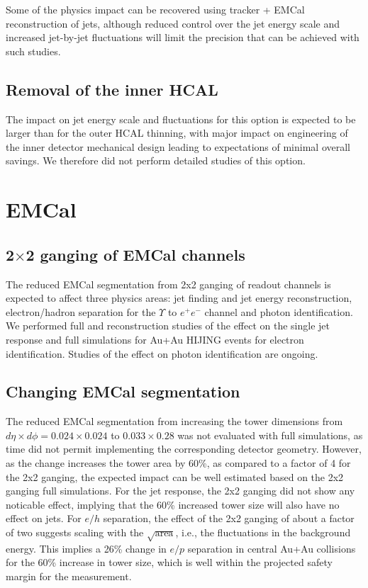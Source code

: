 Some of the physics impact can be recovered using tracker + EMCal reconstruction of jets, although reduced control over the jet 
energy scale and increased jet-by-jet fluctuations will limit the precision that can be achieved with such studies.

\subsection{Removal of the inner HCAL}

The impact on jet energy scale and fluctuations for this option is expected to be larger than for the outer HCAL thinning, 
with major impact on engineering of the inner detector mechanical design leading to expectations of minimal overall savings.
We therefore did not perform detailed studies of this option.

\section{EMCal}
\subsection{2$\times$2 ganging of EMCal channels}
The reduced EMCal segmentation from 2x2 ganging of readout channels is expected to affect three physics areas: jet finding 
and jet energy reconstruction, electron/hadron separation for the $\Upsilon$ to $e^+ e^-$ channel and photon identification.
We performed full \geant and reconstruction studies of the effect on the single jet response and full \geant simulations for 
Au+Au HIJING events for electron identification. Studies of the effect on photon identification are ongoing.

\subsection{Changing EMCal segmentation}
The reduced EMCal segmentation from increasing the tower dimensions
from $d\eta \times d\phi = 0.024 \times 0.024$ to $0.033 \times 0.28$
was not evaluated with full \geant simulations, as time did not permit
implementing the corresponding detector geometry. However, as the
change increases the tower area by 60\%, as compared to a factor of 4
for the 2x2 ganging, the expected impact can be well estimated based
on the 2x2 ganging full simulations. For the jet response, the 2x2
ganging did not show any noticable effect, implying that the 60\%
increased tower size will also have no effect on jets. For $e/h$
separation, the effect of the 2x2 ganging of about a factor of two
suggests scaling with the $\sqrt{\mbox{area}}$, i.e., the fluctuations
in the background energy. This implies a 26\% change in $e/p$
separation in central Au+Au collisions for the 60\% increase in tower
size, which is well within the projected safety margin for the
measurement.

